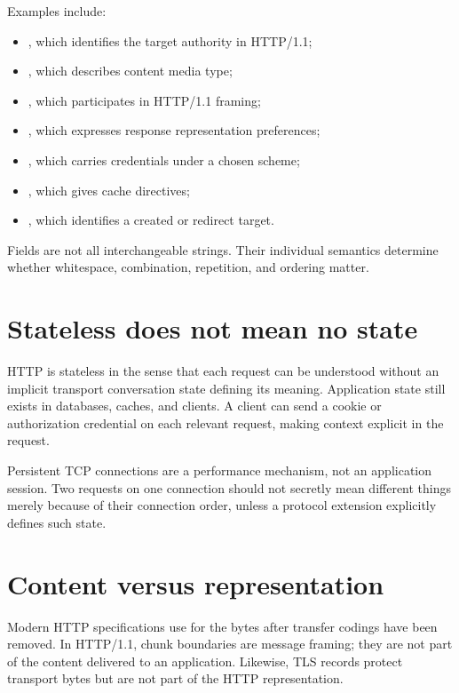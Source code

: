 Examples include:

\begin{itemize}
  \item {}, which identifies the target authority in HTTP/1.1;
  \item {}, which describes content media type;
  \item {}, which participates in HTTP/1.1 framing;
  \item {}, which expresses response representation preferences;
  \item {}, which carries credentials under a chosen scheme;
  \item {}, which gives cache directives;
  \item {}, which identifies a created or redirect target.
\end{itemize}

Fields are not all interchangeable strings. Their individual semantics determine
whether whitespace, combination, repetition, and ordering matter.

\section{Stateless does not mean no state}

HTTP is stateless in the sense that each request can be understood without an
implicit transport conversation state defining its meaning. Application state
still exists in databases, caches, and clients. A client can send a cookie or
authorization credential on each relevant request, making context explicit in
the request.

Persistent TCP connections are a performance mechanism, not an application
session. Two requests on one connection should not secretly mean different
things merely because of their connection order, unless a protocol extension
explicitly defines such state.

\section{Content versus representation}

Modern HTTP specifications use  for the bytes after transfer
codings have been removed. In HTTP/1.1, chunk boundaries are message framing;
they are not part of the content delivered to an application. Likewise, TLS
records protect transport bytes but are not part of the HTTP representation.

